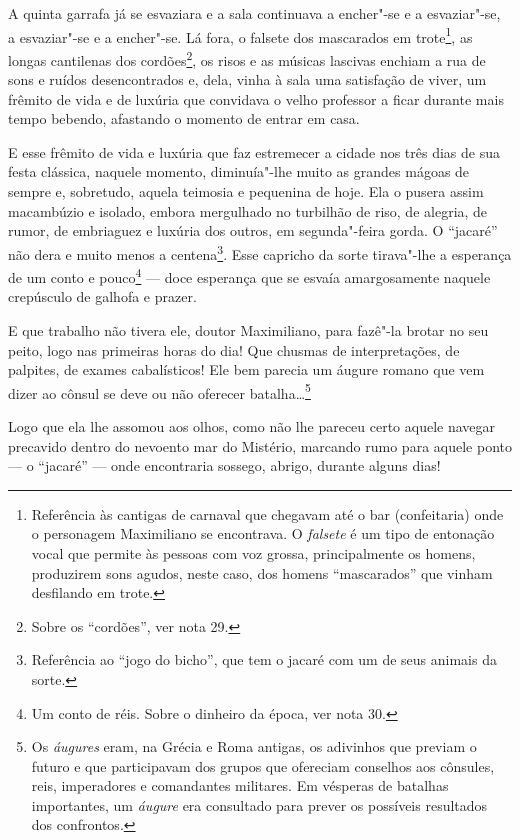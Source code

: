 A quinta garrafa já se esvaziara e a sala continuava a encher"-se e a
esvaziar"-se, a esvaziar"-se e a encher"-se. Lá fora, o falsete dos
mascarados em trote\footnote{Referência às cantigas de carnaval que
  chegavam até o bar (confeitaria) onde o personagem Maximiliano se
  encontrava. O \emph{falsete} é um tipo de entonação vocal que permite
  às pessoas com voz grossa, principalmente os homens, produzirem sons
  agudos, neste caso, dos homens ``mascarados'' que vinham desfilando em
  trote.}, as longas cantilenas dos cordões\footnote{Sobre os
  ``cordões'', ver nota 29.}, os risos e as músicas lascivas enchiam a
rua de sons e ruídos desencontrados e, dela, vinha à sala uma satisfação
de viver, um frêmito de vida e de luxúria que convidava o velho
professor a ficar durante mais tempo bebendo, afastando o momento de
entrar em casa.

E esse frêmito de vida e luxúria que faz estremecer a cidade nos três
dias de sua festa clássica, naquele momento, diminuía"-lhe muito as
grandes mágoas de sempre e, sobretudo, aquela teimosia e pequenina de
hoje. Ela o pusera assim macambúzio e isolado, embora mergulhado no
turbilhão de riso, de alegria, de rumor, de embriaguez e luxúria dos
outros, em segunda"-feira gorda. O ``jacaré'' não dera e muito menos a
centena\footnote{Referência ao ``jogo do bicho'', que tem o jacaré com
  um de seus animais da sorte.}. Esse capricho da sorte tirava"-lhe a
esperança de um conto e pouco\footnote{Um conto de réis. Sobre o
  dinheiro da época, ver nota 30.} --- doce esperança que se esvaía
amargosamente naquele crepúsculo de galhofa e prazer.

E que trabalho não tivera ele, doutor Maximiliano, para fazê"-la brotar
no seu peito, logo nas primeiras horas do dia! Que chusmas de
interpretações, de palpites, de exames cabalísticos! Ele bem parecia um
áugure romano que vem dizer ao cônsul se deve ou não oferecer
batalha\ldots{}\footnote{Os \emph{áugures} eram, na Grécia e Roma antigas, os
  adivinhos que previam o futuro e que participavam dos grupos que
  ofereciam conselhos aos cônsules, reis, imperadores e comandantes
  militares. Em vésperas de batalhas importantes, um \emph{áugure} era
  consultado para prever os possíveis resultados dos confrontos.}

Logo que ela lhe assomou aos olhos, como não lhe pareceu certo aquele
navegar precavido dentro do nevoento mar do Mistério, marcando rumo para
aquele ponto --- o ``jacaré'' --- onde encontraria sossego, abrigo, durante
alguns dias!

